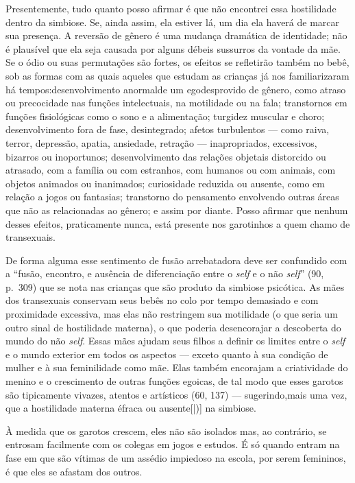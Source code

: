 Presentemente, tudo quanto posso afirmar é que não encontrei essa
hostilidade dentro da simbiose. Se, ainda assim, ela estiver lá, um dia
ela haverá de marcar sua presença. A reversão de gênero\idxidenrev{} é uma mudança
dramática de identidade; não é plausível que ela seja causada por
alguns débeis sussurros da vontade da mãe. Se o ódio ou suas
permutações são fortes, os efeitos se refletirão também no bebê, sob as
formas com as quais aqueles que estudam as crianças já nos
familiarizaram há tempos:\idxtransepres[|(] desenvolvimento anormal\idxegoi[|(] de um ego\idxinfanego[|(] desprovido
de gênero, como atraso ou precocidade nas funções intelectuais, na
motilidade ou na fala; transtornos em funções fisiológicas como o sono
e a alimentação; turgidez muscular e choro; desenvolvimento fora de
fase, desintegrado; afetos turbulentos --- como raiva, terror,
depressão, apatia, ansiedade, retração --- inapropriados, excessivos,
bizarros ou inoportunos; desenvolvimento das relações objetais
distorcido ou atrasado, com a família ou com estranhos, com humanos ou
com animais, com objetos animados ou inanimados; curiosidade reduzida
ou ausente, como em relação a jogos ou fantasias; transtorno do
pensamento envolvendo outras áreas que não as relacionadas ao gênero; e
assim por diante. Posso afirmar que nenhum desses efeitos, praticamente
nunca, está presente nos garotinhos a quem chamo de transexuais.

De forma alguma esse sentimento de fusão arrebatadora deve ser
confundido com a ``fusão, encontro, e ausência de
diferenciação entre o \textit{self} e o não \textit{self}'' (90, p.~309) que
se nota nas crianças que são produto da simbiose psicótica. As mães dos
transexuais conservam seus bebês no colo por tempo demasiado e com
proximidade excessiva, mas elas não restringem sua motilidade (o que
seria um outro sinal de hostilidade materna), o que poderia
desencorajar a descoberta do mundo do não \textit{self}. Essas mães ajudam seus
filhos a definir os limites entre o \textit{self} e o mundo exterior em todos os
aspectos --- exceto quanto à sua condição de mulher e à sua
feminilidade como mãe. Elas também encorajam a criatividade\idxcriatran{} do menino e
o crescimento de outras funções egoicas, de tal modo que esses garotos
são tipicamente vivazes, atentos e artísticos (60, 137) --- sugerindo,\idxhostmaes[|)]
mais uma vez, que a hostilidade materna é\idxmaesfilh[|)] fraca ou ausente[|)] na simbiose.\idxangushos[|)]

À medida que os garotos crescem, eles não são isolados mas, ao
contrário, se entrosam facilmente com os colegas em jogos e estudos. É
só quando entram na fase em que são vítimas de um assédio impiedoso na
escola, por serem femininos, é que eles se afastam dos outros.

